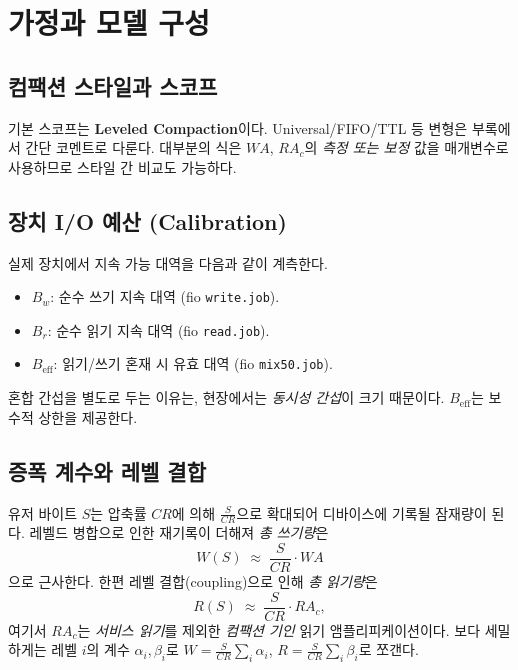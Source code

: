 \documentclass[11pt,a4paper]{article}
\begin{document}
\section{가정과 모델 구성}
\subsection{컴팩션 스타일과 스코프}
기본 스코프는 \textbf{Leveled Compaction}이다. Universal/FIFO/TTL 등 변형은
부록에서 간단 코멘트로 다룬다. 대부분의 식은 \(WA\), \(RA_c\)의 \emph{측정 또는 보정} 값을
매개변수로 사용하므로 스타일 간 비교도 가능하다.

\subsection{장치 I/O 예산 (Calibration)}
실제 장치에서 지속 가능 대역을 다음과 같이 계측한다.
\begin{itemize}
  \item \(B_w\): 순수 쓰기 지속 대역 (fio \texttt{write.job}).
  \item \(B_r\): 순수 읽기 지속 대역 (fio \texttt{read.job}).
  \item \(B_{\text{eff}}\): 읽기/쓰기 혼재 시 유효 대역 (fio \texttt{mix50.job}).
\end{itemize}
혼합 간섭을 별도로 두는 이유는, 현장에서는 \emph{동시성 간섭}이 크기 때문이다.
\(B_{\text{eff}}\)는 보수적 상한을 제공한다.

\subsection{증폭 계수와 레벨 결합}
유저 바이트 \(S\)는 압축률 \(CR\)에 의해 \(\frac{S}{CR}\)으로 확대되어 디바이스에 기록될 잠재량이 된다.
레벨드 병합으로 인한 재기록이 더해져 \emph{총 쓰기량}은
\begin{equation}
  W(S) \;\approx\; \frac{S}{CR}\cdot WA
  \label{eq:W}
\end{equation}
으로 근사한다. 한편 레벨 결합(coupling)으로 인해 \emph{총 읽기량}은
\begin{equation}
  R(S) \;\approx\; \frac{S}{CR}\cdot RA_c,
  \label{eq:R}
\end{equation}
여기서 \(RA_c\)는 \emph{서비스 읽기}를 제외한 \emph{컴팩션 기인} 읽기 앰플리피케이션이다.
보다 세밀하게는 레벨 \(i\)의 계수 \(\alpha_i,\beta_i\)로
\(W=\tfrac{S}{CR}\sum_i \alpha_i\), \(R=\tfrac{S}{CR}\sum_i \beta_i\)로 쪼갠다.
\end{document}
